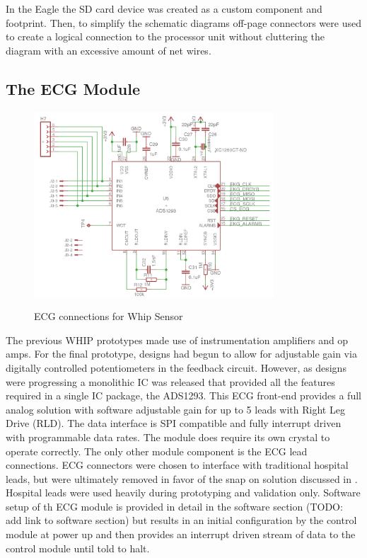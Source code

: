In the Eagle the SD card device was created as a custom component and footprint. Then, to simplify the schematic diagrams off-page connectors were used to create a logical connection to the processor unit without cluttering the diagram with an excessive amount of net wires.

\subsection{The ECG Module}
\begin{figure}
	\begin{center}
		\label{fig:Rev5_ECG}
		\includegraphics[scale=1,width=0.8\textwidth]{Images/Rev5_ECG.png} 
		\caption{ECG connections for Whip Sensor}
	\end{center}
\end{figure}

The previous WHIP prototypes made use of instrumentation amplifiers and op amps. For the final prototype, designs had begun to allow for adjustable gain via digitally controlled potentiometers in the feedback circuit. However, as designs were progressing a monolithic IC was released that provided all the features required in a single IC package, the ADS1293. This ECG front-end provides a full analog solution with software adjustable gain for up to 5 leads with Right Leg Drive (RLD). The data interface is SPI compatible and fully interrupt driven with programmable data rates. The module does require its own crystal to operate correctly. The only other module component is the ECG lead connections. ECG connectors were chosen to interface with traditional hospital leads, but were ultimately removed in favor of the snap on solution discussed in . Hospital leads were used heavily during prototyping and validation only. Software setup of th ECG module is provided in detail in the software section (TODO: add link to software section) but results in an initial configuration by the control module at power up and then provides an interrupt driven stream of data to the control module until told to halt.

